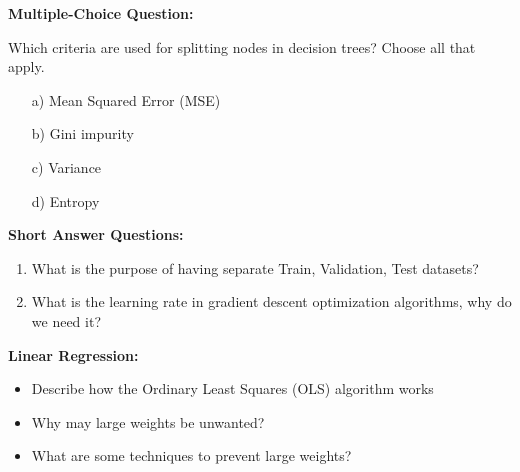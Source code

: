 

\begin{problem} \textbf{Multiple-Choice Question:}

\item Which criteria are used for splitting nodes in decision trees? Choose all that apply.


\begin{enumerate}
    \item [a)] Mean Squared Error (MSE)
    \item [b)] Gini impurity
    \item [c)] Variance
    \item [d)] Entropy
\end{enumerate}
% 
\end{problem}


\begin{problem} \textbf{Short Answer Questions:}

\begin{enumerate}

    \item 
What is the purpose of having separate Train, Validation, Test datasets?


    \item 
 What is the learning rate in gradient descent optimization algorithms, why do we need it?


\end{enumerate}
    
\end{problem}




\begin{problem}
    \textbf{Linear Regression:}



\begin{itemize}
    \item Describe how the Ordinary Least Squares (OLS) algorithm works
    
    \item Why may large weights be unwanted?

    \item What are some techniques to prevent large weights?
\end{itemize}
\end{problem}

